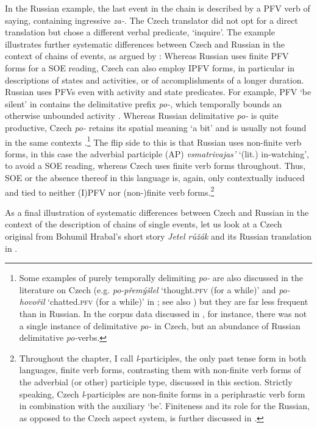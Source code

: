 \documentclass[output=paper,colorlinks,citecolor=brown]{langscibook}
\begin{document}
\noindent In the Russian example, the last event in the chain is described by a PFV verb of saying, containing ingressive \textit{za-}. The Czech translator did not opt for a direct translation but chose a different verbal predicate, `inquire'. The example illustrates further systematic differences between Czech and Russian in the context of chains of events, as argued by \citet{gehrke22}: Whereas Russian uses finite PFV forms for a SOE reading, Czech can also employ IPFV forms, in particular in descriptions of states and activities, or of accomplishments of a longer duration. Russian uses PFVs even with activity and state predicates. For example, PFV `be silent' in  contains the delimitative prefix \textit{po-}, which temporally bounds an otherwise unbounded activity \citep[see][]{isacenko62}. Whereas Russian delimitative \textit{po-} is quite productive, Czech \textit{po-} retains its spatial meaning `a bit' and is usually not found in the same contexts \citep[see, e.g.,][]{gehrke02,gehrke22,dickeyhutch,dickey11}.\footnote{Some examples of purely temporally delimiting \textit{po-} are also discussed in the literature on Czech (e.g. \textit{po-přemýšlel} `thought.\textsc{pfv} (for a while)' and \textit{po-hovořil} `chatted.\textsc{pfv} (for a while)' in \citealt{souckovapo}; see also \citealt{biskup24}) but they are far less frequent than in Russian. In the corpus data discussed in \citet{gehrke02}, for instance, there was not a single instance of delimitative \textit{po-} in Czech, but an abundance of Russian delimitative \textit{po-}verbs.} The flip side to this is that Russian uses non-finite verb forms, in this case the adverbial participle (AP) \textit{vsmatrivajas’} `(lit.) in-watching', to avoid a SOE reading, whereas Czech uses finite verb forms throughout. Thus, SOE or the absence thereof in this language is, again, only contextually induced and tied to neither (I)PFV nor (non-)finite verb forms.\footnote{Throughout the chapter, I call \textit{l}-participles, the only past tense form in both languages, finite verb forms, contrasting them with non-finite verb forms of the adverbial (or other) participle type, discussed in this section. Strictly speaking, Czech \textit{l}-participles are non-finite forms in a periphrastic verb form in combination with the auxiliary `be'. Finiteness and its role for the Russian, as opposed to the Czech aspect system, is further discussed in \citet{gehrkeadv23}.} 

As a final illustration of systematic differences between Czech and Russian in the context of the description of chains of single events, let us look at a Czech original from Bohumil Hrabal's short story \textit{Jetel růžák} and its Russian translation in  \citep[discussed in][21f.]{gehrke22} \citep[see also][]{gehrke02}%
. 
\end{document}
